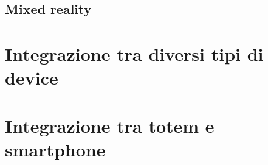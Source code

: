 \subsection{Mixed reality}

%
\section{Integrazione tra diversi tipi di device}
\section{Integrazione tra totem e smartphone}